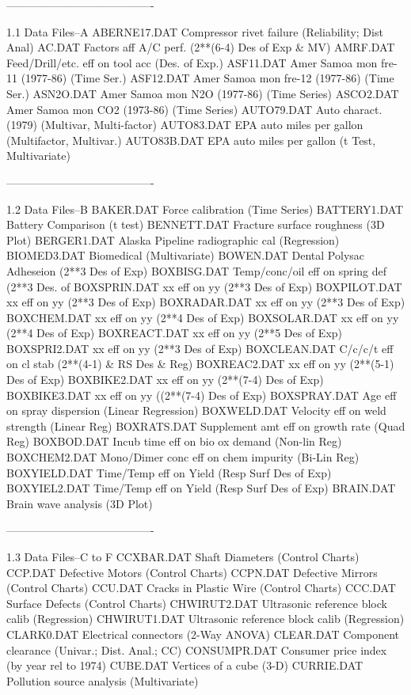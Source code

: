 ----------------------------------------
 
1.1
Data Files--A
      ABERNE17.DAT   Compressor rivet failure (Reliability; Dist Anal)
      AC.DAT        Factors aff A/C perf. (2**(6-4) Des of Exp & MV)
      AMRF.DAT      Feed/Drill/etc. eff on tool acc (Des. of Exp.)
      ASF11.DAT     Amer Samoa mon fre-11 (1977-86) (Time Ser.)
      ASF12.DAT     Amer Samoa mon fre-12 (1977-86) (Time Ser.)
      ASN2O.DAT     Amer Samoa mon N2O (1977-86) (Time Series)
      ASCO2.DAT     Amer Samoa mon CO2 (1973-86) (Time Series)
      AUTO79.DAT    Auto charact. (1979) (Multivar, Multi-factor)
      AUTO83.DAT    EPA auto miles per gallon (Multifactor, Multivar.)
      AUTO83B.DAT   EPA auto miles per gallon (t Test, Multivariate)
 
 
 
 
----------------------------------------
 
1.2
Data Files--B
      BAKER.DAT     Force calibration (Time Series)
      BATTERY1.DAT  Battery Comparison (t test)
      BENNETT.DAT   Fracture surface roughness (3D Plot)
      BERGER1.DAT   Alaska Pipeline radiographic cal (Regression)
      BIOMED3.DAT   Biomedical (Multivariate)
      BOWEN.DAT     Dental Polysac Adheseion (2**3 Des of Exp)
      BOXBISG.DAT   Temp/conc/oil eff on spring def (2**3 Des. of
      BOXSPRIN.DAT  xx eff on yy (2**3 Des of Exp)
      BOXPILOT.DAT  xx eff on yy (2**3 Des of Exp)
      BOXRADAR.DAT  xx eff on yy (2**3 Des of Exp)
      BOXCHEM.DAT   xx eff on yy (2**4 Des of Exp)
      BOXSOLAR.DAT  xx eff on yy (2**4 Des of Exp)
      BOXREACT.DAT  xx eff on yy (2**5 Des of Exp)
      BOXSPRI2.DAT  xx eff on yy (2**3 Des of Exp)
      BOXCLEAN.DAT  C/c/c/t eff on cl stab (2**(4-1) & RS Des & Reg)
      BOXREAC2.DAT  xx eff on yy (2**(5-1) Des of Exp)
      BOXBIKE2.DAT  xx eff on yy (2**(7-4) Des of Exp)
      BOXBIKE3.DAT  xx eff on yy ((2**(7-4) Des of Exp)
      BOXSPRAY.DAT  Age eff on spray dispersion (Linear Regression)
      BOXWELD.DAT   Velocity eff on weld strength (Linear Reg)
      BOXRATS.DAT   Supplement amt eff on growth rate (Quad Reg)
      BOXBOD.DAT    Incub time eff on bio ox demand (Non-lin Reg)
      BOXCHEM2.DAT  Mono/Dimer conc eff on chem impurity (Bi-Lin Reg)
      BOXYIELD.DAT  Time/Temp eff on Yield (Resp Surf Des of Exp)
      BOXYIEL2.DAT  Time/Temp eff on Yield (Resp Surf Des of Exp)
      BRAIN.DAT     Brain wave analysis (3D Plot)
 
----------------------------------------
 
1.3
Data Files--C to F
      CCXBAR.DAT    Shaft Diameters (Control Charts)
      CCP.DAT       Defective Motors (Control Charts)
      CCPN.DAT      Defective Mirrors (Control Charts)
      CCU.DAT       Cracks in Plastic Wire (Control Charts)
      CCC.DAT       Surface Defects (Control Charts)
      CHWIRUT2.DAT  Ultrasonic reference block calib (Regression)
      CHWIRUT1.DAT  Ultrasonic reference block calib (Regression)
      CLARK0.DAT    Electrical connectors (2-Way ANOVA)
      CLEAR.DAT     Component clearance (Univar.; Dist. Anal.; CC)
      CONSUMPR.DAT  Consumer price index (by year rel to 1974)
      CUBE.DAT      Vertices of a cube (3-D)
      CURRIE.DAT    Pollution source analysis (Multivariate)
 
